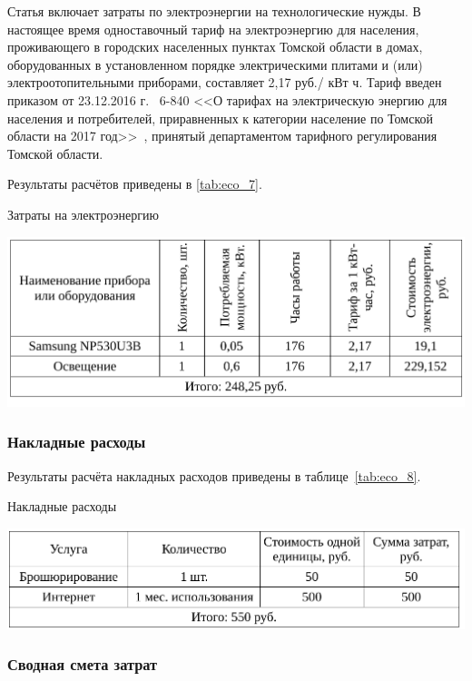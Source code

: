 Статья включает затраты по электроэнергии на технологические нужды. В настоящее время одноставочный
тариф на электроэнергию для населения, проживающего в городских населенных
пунктах Томской области в домах, оборудованных в установленном порядке электрическими 
плитами и (или) электроотопительными приборами,
составляет 2,17 руб./ кВт ч. Тариф введен 
приказом от 23.12.2016 г. \textnumero~6-840 <<О тарифах на электрическую энергию для населения и 
потребителей, приравненных к категории население по Томской области на 2017 год>>~\cite{electr}, 
принятый департаментом тарифного регулирования Томской области.

Результаты расчётов приведены в \ref{tab:eco_7}.

\begin{table}[ht!]
\caption{Затраты на электроэнергию}
\centering
\includegraphics[page=1, width=1\linewidth]{tables/economics/econom_2.pdf}
\label{tab:eco_7}
\end{table}


\subsubsection{Накладные расходы}

Результаты расчёта накладных расходов приведены в таблице~\ref{tab:eco_8}.

\begin{table}[ht!]
\caption{Накладные расходы}
\centering
\includegraphics[page=1, width=1\linewidth]{tables/economics/econom_3.pdf}
\label{tab:eco_8}
\end{table}


\subsubsection{Сводная смета затрат}

